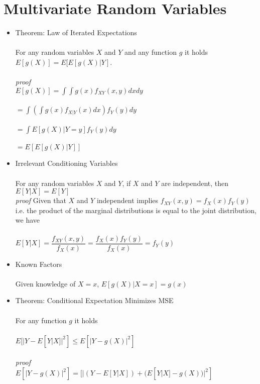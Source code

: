 \documentclass{article}
\begin{document}
\section{Multivariate Random Variables}
\begin{itemize}
    \item Theorem: Law of Iterated Expectations\\\\
    For any random variables $X$ and $Y$ and any function $g$ it holds $E[g(X)]=E[E[g(X)|Y]$.\\\\
    \emph{proof}\\
    $E[g(X)]=\int\int g(x)f_{XY}(x,y)dxdy$\\\\
    $=\int(\int g(x)f_{X|Y}(x)dx)f_Y(y)dy$\\\\
    $=\int E[g(X)|Y=y]f_Y(y)dy$\\\\
    $=E[E[g(X)|Y]]$\\
    \item Irrelevant Conditioning Variables\\\\
    For any random variables $X$ and $Y$, if $X$ and $Y$ are independent, then $E[Y|X]=E[Y]$\\
    \emph{proof}
    Given that $X$ and $Y$ independent implies $f_{XY}(x,y)=f_X(x)f_Y(y)$ i.e. the product of the marginal distributions is equal to the joint distribution, we have\\\\
    $E[Y|X]=\dfrac{f_{XY}(x,y)}{f_X(x)}=\dfrac{f_X(x)f_Y(y)}{f_X(x)}=f_Y(y)$\\
    \item Known Factors\\\\
    Given knowledge of $X=x$, $E[g(X)|X=x]=g(x)$\\
    \item Theorem: Conditional Expectation Minimizes MSE\\\\
    For any function $g$ it holds\\\\
    $E[|Y-E[Y|X]|^2]\leq E[|Y-g(X)|^2]$\\\\
    \emph{proof}\\
    $E[|Y-g(X)|^2]=[|(Y-E[Y|X])+(E[Y|X]-g(X))|^2]$\\\\

\end{itemize}
\end{document}
